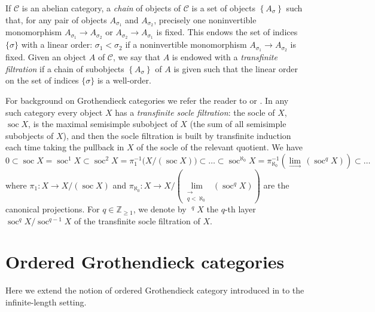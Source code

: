 \documentclass[11pt]{article}
\theoremstyle{plain}
\theoremstyle{nonumberplain}
\theoremstyle{plain}
\theoremstyle{nonumberplain}
\DeclareMathOperator{\soc}{\mathrm{soc}}
\DeclareMathOperator{\usoc}{\underline{\mathrm{soc}}}
\begin{document}
        If $\mathcal{C}$ is an abelian category, a \emph{chain} of
        objects of $\mathcal{C}$ is a set of objects
        $\left\{A_\sigma\right\}$ such that, for any pair of objects
        $A_{\sigma_1}$ and $A_{\sigma_2}$, precisely one noninvertible
        monomorphism $A_{\sigma_1}\to A_{\sigma_2}$ or
        $A_{\sigma_2}\to A_{\sigma_1}$ is fixed.  This endows the set
        of indices $\{\sigma\}$ with a linear order:
        $\sigma_1 <\sigma_2$ if a noninvertible monomorphism
        $A_{\sigma_1}\to A_{\sigma_2}$ is fixed.  Given an object $A$
        of $\mathcal{C}$, we say that $A$ is endowed with a
        \emph{transfinite filtration} if a chain of subobjects
        $\left\{A_\sigma\right\}$ of $A$ is given such that the linear
        order on the set of indices $\{\sigma\}$ is a well-order.


        For background on Grothendieck categories we refer the reader
        to \cite[$\S$1.1]{grk} or \cite[$\S$2.8]{groth}. In any such
        category every object $X$ has a \emph{transfinite socle
          filtration}: the socle of $X$, $\soc X$, is the maximal
        semisimple subobject of $X$ (the sum of all semisimple
        subobjects of $X$), and then the socle filtration is built by
        transfinite induction each time taking the pullback in $X$ of
        the socle of the relevant quotient.  We have
$$0 \subset \soc X=\soc^1 X \subset \soc^2 X =\pi_1^{-1}\big(X/(\soc X)\big)\subset\ldots\subset \soc^{\aleph_0}X=\pi^{-1}_{\aleph_0}\left(\lim\limits_{\longrightarrow}\,\left(\soc^qX\right)\right)\subset\ldots$$
where $\pi_1:X\to X/(\soc X)$ and
$\pi_{\aleph_0}:X\to
X/\left(\lim\limits_{\substack{{\longrightarrow}\\{q<\aleph_0}}}\,\left(\soc^qX\right)\right)$
are the canonical projections.  For $q \in\mathbb{Z}_{\geq 1}$, we denote by $\usoc^qX$ the $q$-th layer $\soc^q X/\soc^{q-1} X$ of the transfinite socle filtration of $X$.

\section{Ordered Grothendieck categories}\label{se.abs}


Here we extend the notion of ordered Grothendieck category introduced
in \cite{us} to the infinite-length setting.
\end{document}
